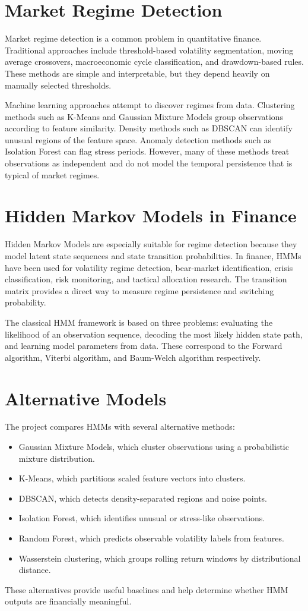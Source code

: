 \documentclass[12pt,a4paper]{report}
\begin{document}
\section{Market Regime Detection}
Market regime detection is a common problem in quantitative finance. Traditional approaches include threshold-based volatility segmentation, moving average crossovers, macroeconomic cycle classification, and drawdown-based rules. These methods are simple and interpretable, but they depend heavily on manually selected thresholds.

Machine learning approaches attempt to discover regimes from data. Clustering methods such as K-Means and Gaussian Mixture Models group observations according to feature similarity. Density methods such as DBSCAN can identify unusual regions of the feature space. Anomaly detection methods such as Isolation Forest can flag stress periods. However, many of these methods treat observations as independent and do not model the temporal persistence that is typical of market regimes.

\section{Hidden Markov Models in Finance}
Hidden Markov Models are especially suitable for regime detection because they model latent state sequences and state transition probabilities. In finance, HMMs have been used for volatility regime detection, bear-market identification, crisis classification, risk monitoring, and tactical allocation research. The transition matrix provides a direct way to measure regime persistence and switching probability.

The classical HMM framework is based on three problems: evaluating the likelihood of an observation sequence, decoding the most likely hidden state path, and learning model parameters from data. These correspond to the Forward algorithm, Viterbi algorithm, and Baum-Welch algorithm respectively.

\section{Alternative Models}
The project compares HMMs with several alternative methods:
\begin{itemize}
    \item Gaussian Mixture Models, which cluster observations using a probabilistic mixture distribution.
    \item K-Means, which partitions scaled feature vectors into clusters.
    \item DBSCAN, which detects density-separated regions and noise points.
    \item Isolation Forest, which identifies unusual or stress-like observations.
    \item Random Forest, which predicts observable volatility labels from features.
    \item Wasserstein clustering, which groups rolling return windows by distributional distance.
\end{itemize}
These alternatives provide useful baselines and help determine whether HMM outputs are financially meaningful.
\end{document}
